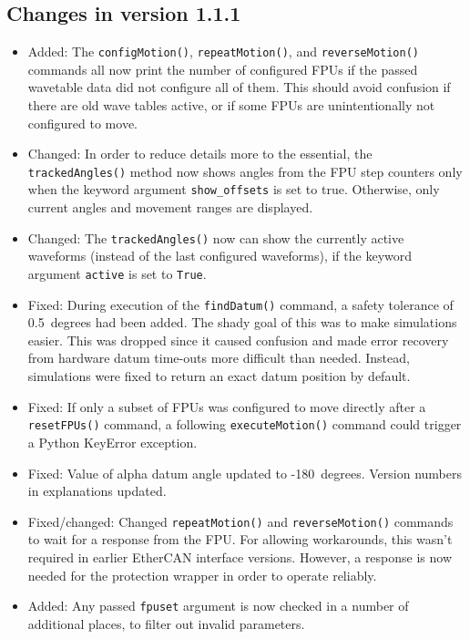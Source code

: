 \documentclass[11pt,a4paper]{scrartcl}
\begin{document}
\subsection*{Changes in version 1.1.1}
\begin{itemize}
\item Added: The \texttt{configMotion()}, \texttt{repeatMotion()}, and
  \texttt{reverseMotion()} commands all now print the number of
  configured FPUs if the passed wavetable data did not configure all
  of them. This should avoid confusion if there are old wave tables
  active, or if some FPUs are unintentionally not configured to move.

\item Changed: In order to reduce details more to the essential, the
  \texttt{trackedAngles()} method now shows angles from the FPU step
  counters only when the keyword argument \texttt{show\_offsets} is
  set to true. Otherwise, only current angles and movement ranges are
  displayed.

\item Changed: The \texttt{trackedAngles()} now can show the currently
  active waveforms (instead of the last configured waveforms), if the
  keyword argument \texttt{active} is set to \texttt{True}.
  
\item Fixed: During execution of the \texttt{findDatum()} command, a
  safety tolerance of 0.5\degree\ degrees had been added. The shady goal of
  this was to make simulations easier. This was dropped since it
  caused confusion and made error recovery from hardware datum
  time-outs more difficult than needed. Instead, simulations were
  fixed to return an exact datum position by default.
  
\item Fixed: If only a subset of FPUs was configured to move directly
  after a \texttt{resetFPUs()} command, a following
  \texttt{executeMotion()} command could trigger a Python KeyError
  exception.
  
\item Fixed: Value of alpha datum angle updated to
  -180\degree\ degrees. Version numbers in explanations updated.

\item Fixed/changed: Changed \texttt{repeatMotion()} and
  \texttt{reverseMotion()} commands to wait for a response from the
  FPU. For allowing workarounds, this wasn't required in earlier
  EtherCAN interface versions.  However, a response is now needed for the
  protection wrapper in order to operate reliably.

\item Added: Any passed \texttt{fpuset} argument is now checked in a
  number of additional places, to filter out invalid parameters.
\end{itemize}
\end{document}
